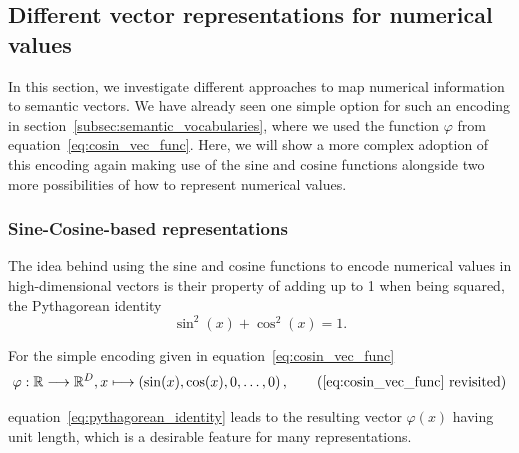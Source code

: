 \subsection{Different vector representations for numerical values}%
\label{subsec:different_vector_representations_for_numerical_values}

In this section, we investigate different approaches to map numerical information to semantic vectors.
We have already seen one simple option for such an encoding in section~\ref{subsec:semantic_vocabularies}, where we used the function $\varphi$ from equation~\eqref{eq:cosin_vec_func}.
Here, we will show a more complex adoption of this encoding again making use of the sine and cosine functions alongside two more possibilities of how to represent numerical values.

\subsubsection{Sine-Cosine-based representations}%
\label{ssubsec:sine_cosine_based_representations}

The idea behind using the sine and cosine functions to encode numerical values in high-dimensional vectors is their property of adding up to \num{1} when being squared, the Pythagorean identity
\begin{equation}
\label{eq:pythagorean_identity}
\sin^{2}(x) + \cos^{2}(x) = 1.
\end{equation}

For the simple encoding given in equation~\eqref{eq:cosin_vec_func} 
\begin{equation}
\abb{\varphi}{\mathbb{R}}{\mathbb{R}^{D}}{x}{\left(\sin(x), \cos(x), 0, \ldots, 0\right)},
\tag{\eqref{eq:cosin_vec_func} revisited}
\end{equation}

equation~\eqref{eq:pythagorean_identity} leads to the resulting vector $\varphi(x)$ having unit length, which is a desirable feature for many representations.

